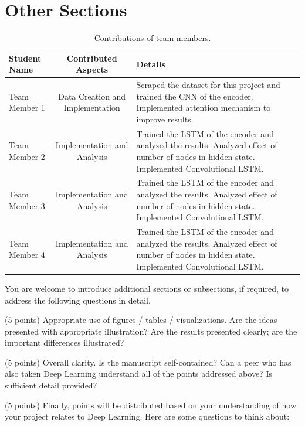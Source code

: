 \documentclass[10pt,twocolumn,letterpaper]{article}
\begin{document}
\section{Other Sections}

\begin{table}
\begin{center}
\begin{tabular}{|l|c|p{8cm}|}
\hline
Student Name & Contributed Aspects & Details \\
\hline\hline
Team Member 1 & Data Creation and Implementation & Scraped the dataset for this project and trained the CNN of the encoder. Implemented attention mechanism to improve results. \\
Team Member 2 & Implementation and Analysis & Trained the LSTM of the encoder and analyzed the results. Analyzed effect of number of nodes in hidden state.  Implemented Convolutional LSTM. \\
Team Member 3 & Implementation and Analysis & Trained the LSTM of the encoder and analyzed the results. Analyzed effect of number of nodes in hidden state.  Implemented Convolutional LSTM. \\
Team Member 4 & Implementation and Analysis & Trained the LSTM of the encoder and analyzed the results. Analyzed effect of number of nodes in hidden state.  Implemented Convolutional LSTM. \\
\hline
\end{tabular}
\end{center}
\caption{Contributions of team members.}
\label{tab:contributions}
\end{table}



You are welcome to introduce additional sections or subsections, if required, to address the following questions in detail. 

(5 points) Appropriate use of figures / tables / visualizations. Are the ideas presented with appropriate illustration? Are the results presented clearly; are the important differences illustrated? 

(5 points) Overall clarity. Is the manuscript self-contained? Can a peer who has also taken Deep Learning understand all of the points addressed above? Is sufficient detail provided? 

(5 points) Finally, points will be distributed based on your understanding of how your project relates to Deep Learning. Here are some questions to think about: 
\end{document}
